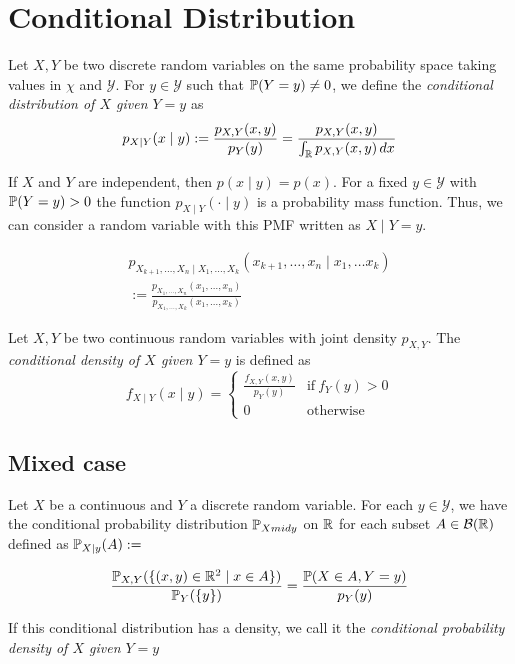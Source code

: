 \section{Conditional Distribution}
\begin{ddefinition*}
  Let \(X, Y\) be two discrete random variables on the same probability space taking values in \(\chi\) and \(\mathcal{Y}\). For \(y \in \mathcal{Y}\) such that \(\P(Y = y) \neq 0\), we define the \textit{conditional distribution of \(X\) given \(Y = y\)} as
  \[p_{X \mid Y}(x \mid y) := \frac{p_{X, Y}(x, y)}{p_Y(y)} = \frac{p_{X, Y}(x, y)}{\int_\R p_{X, Y}(x, y) \,dx}\]
\end{ddefinition*}

If \(X\) and \(Y\) are independent, then \(p(x \mid y) = p(x)\). For a fixed \(y \in \mathcal{Y}\) with \(\P(Y = y) > 0\) the function \(p_{X \mid Y}(\cdot \mid y)\) is a probability mass function. Thus, we can consider a random variable with this PMF written as \(X \mid Y = y\).

\begin{dtheorem*}
  \vspace*{-18pt}
  \begin{multline*}
    p_{X_{k+1}, \ldots, X_n \mid X_1, \ldots, X_k}(x_{k+1}, \ldots, x_n \mid x_1, \ldots x_k) \\
    := \frac{p_{X_1, \ldots, X_n}(x_1, \ldots, x_n)}{p_{X_1, \ldots, X_k}(x_1, \ldots, x_k)}
  \end{multline*}
\end{dtheorem*}

\begin{cdefinition*}
  Let \(X, Y\) be two continuous random variables with joint density \(p_{X, Y}\). The \textit{conditional density of \(X\) given \(Y = y\)} is defined as
  \[f_{X \mid Y}(x \mid y) = \begin{cases}
    \frac{f_{X, Y}(x, y)}{p_Y(y)} & \text{if} \ f_Y(y) > 0 \\
    0 & \text{otherwise}
  \end{cases}\]
\end{cdefinition*}

\subsection{Mixed case}
\begin{definition*}
  Let \(X\) be a continuous and \(Y\) a discrete random variable. For each \(y \in \mathcal{Y}\), we have the conditional probability distribution \(\P_{X 
  mid y}\) on \(\R\) for each subset \(A \in \B(\R)\) defined as \(\P_{X \mid y}(A) :=\)
  
  \vspace{-15pt}
  \[\frac{\P_{X, Y}(\{(x, y) \in \R^2 \mid x \in A\})}{\P_Y(\{y\})} = \frac{\P(X \in A, Y = y)}{p_Y(y)}\]
  
  If this conditional distribution has a density, we call it the \textit{conditional probability density of \(X\) given \(Y = y\)}
\end{definition*}

